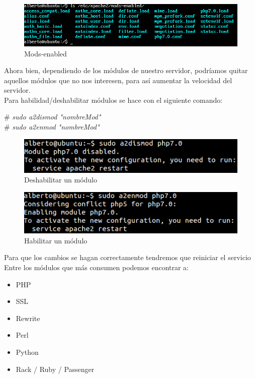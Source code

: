 \begin{figure}[h]
	\centering
	\includegraphics[scale=0.55]{images/enabled.png}
	\caption{Mods-enabled}
\end{figure} 

\newpage
Ahora bien, dependiendo de los módulos de nuestro servidor, podríamos quitar aquellos módulos que no nos interesen, para así aumentar la velocidad del servidor. \\

Para habilidad/deshabilitar módulos se hace con el siguiente comando:

\# \textit{sudo a2dismod "nombreMod"} \\
\# \textit{sudo a2enmod "nombreMod"} \\

\begin{figure}[h]
	\centering
	\includegraphics[scale=0.55]{images/Comandoquitar.png}
	\caption{Deshabilitar un módulo}
\end{figure} 

\begin{figure}[h]
	\centering
	\includegraphics[scale=0.55]{images/k.png}
	\caption{Habilitar un módulo}
\end{figure} 

Para que los cambios se hagan correctamente tendremos que reiniciar el servicio\\

Entre los módulos que más consumen podemos encontrar a:
\begin{itemize}
	\item PHP
	\item SSL
	\item Rewrite
	\item Perl
	\item Python
	\item Rack / Ruby / Passenger
\end{itemize}


